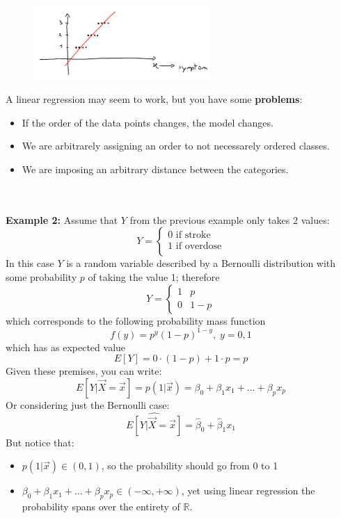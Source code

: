 \begin{figure}[h]
\caption{}
\centering
\includegraphics[width=0.6\textwidth]{LinearRegForClassification}
\label{}
\end{figure}


    A linear regression may seem to work, but you have some \textbf{problems}:
    \begin{itemize}
      \item If the order of the data points changes, the model changes.
      \item We are arbitrarely assigning an order to not necessarely ordered classes.
      \item We are imposing an arbitrary distance between the categories. 
    \end{itemize}
\\
\\
    \textbf{Example 2:} Assume that $Y$ from the previous example only takes 2 values:
    $$
    Y = \begin{cases}
          0 \text{ if stroke} \\
	      1 \text{ if overdose} \\
        \end{cases}
    $$
    In this case $Y$ is a random variable described by a Bernoulli distribution with some probability $p$ of taking the value 1; therefore 
    $$
    Y = \begin{cases}
          1 & p \\
	      0 & 1-p
        \end{cases}
    $$
    which corresponds to the following probability mass function
    $$f(y) = p^y(1-p)^{1-y}, \; y=0,1$$
    which has as expected value
    $$E[Y] = 0 \cdot (1-p) + 1 \cdot p = p$$
    Given these premises, you can write:
    $$E[Y|\vec{X} = \vec{x}] = p(1|\vec{x}) = \beta_0 + \beta_1 x_1 + \dots + \beta_px_p$$
    Or considering just the Bernoulli case:
    $$\hat{E[Y|\vec{X} = \vec{x}]} = \hat{\beta}_0 + \hat{\beta}_1x_1$$
    But notice that:
    \begin{itemize}
      \item $p(1|\vec{x}) \in (0, 1)$, so the probability should go from 0 to 1
      \item $\beta_0 + \beta_1 x_1 + \dots + \beta_px_p \in (-\infty, +\infty)$, yet using linear regression the probability spans over the entirety of $\mathbb{R}$.
    \end{itemize}
    
